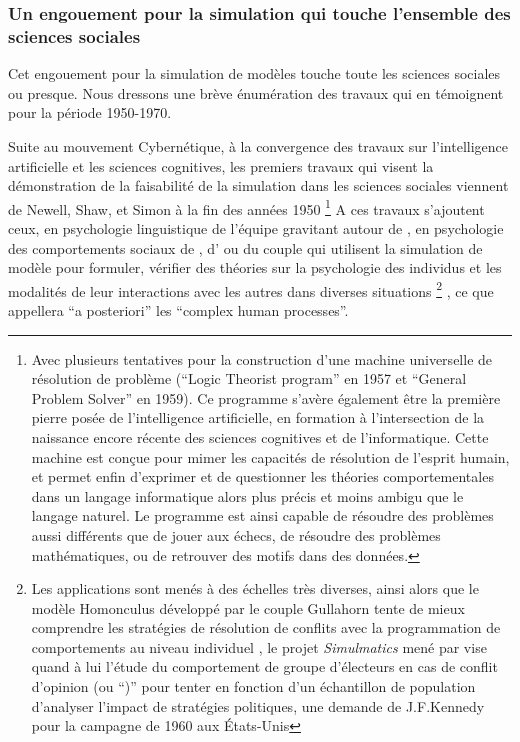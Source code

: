\subsubsection{Un engouement pour la simulation qui touche l'ensemble des sciences sociales}
\label{ssec:engouement_sciencesociale}

Cet engouement pour la simulation de modèles touche toute les sciences sociales ou presque. Nous dressons une brève énumération des travaux qui en témoignent pour la période 1950-1970.

Suite au mouvement Cybernétique, à la convergence des travaux sur l'intelligence artificielle et les sciences cognitives, les premiers travaux qui visent la démonstration de la faisabilité de la simulation dans les sciences sociales viennent de Newell, Shaw, et Simon à la fin des années 1950 \autocite{Gullahorn1965} \footnote{Avec plusieurs tentatives pour la construction d'une machine universelle de résolution de problème (\foreignquote{english}{Logic Theorist program} en 1957 et \foreignquote{english}{General Problem Solver} en 1959). Ce programme s'avère également être la première pierre posée de l'intelligence artificielle, en formation à l'intersection de la naissance encore récente des sciences cognitives et de l'informatique. Cette machine est conçue pour mimer les capacités de résolution de l'esprit humain, et permet enfin d'exprimer et de questionner les théories comportementales dans un langage informatique alors plus précis et moins ambigu que le langage naturel. Le programme est ainsi capable de résoudre des problèmes aussi différents que de jouer aux échecs, de résoudre des problèmes mathématiques,  ou de retrouver des motifs dans des données.} A ces travaux s'ajoutent ceux, en psychologie linguistique de l'équipe gravitant autour de \textcite[280-416]{Borko1962}, en psychologie des comportements sociaux de \textcite{Hovland1960}, d'\textcite{Abelson1961, Abelson1968} ou du couple \autocite{Gullahorn1965a} qui utilisent la simulation de modèle pour formuler, vérifier des théories sur la psychologie des individus et les modalités de leur interactions avec les autres dans diverses situations  \footnote{Les applications sont menés à des échelles très diverses, ainsi alors que le modèle Homonculus développé par le couple Gullahorn tente de mieux comprendre les stratégies de résolution de conflits avec la programmation de comportements au niveau individuel \autocite{Gullahorn1965}, le projet \textit{Simulmatics} mené par \textcite{Abelson1961} vise quand à lui l'étude du comportement de groupe d'électeurs en cas de conflit d'opinion (ou \foreignquote{cross-pressure}) pour tenter en fonction d'un échantillon de population d'analyser l'impact de stratégies politiques, une demande de J.F.Kennedy pour la campagne de 1960 aux États-Unis} , ce que \textcite{Ostrom1988} appellera \foreignquote{latin}{a posteriori} les \foreignquote{english}{complex human processes}.

